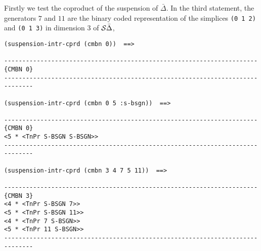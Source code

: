 Firstly we test  the coproduct of the suspension of $\bar\Delta$. In the third
statement, the generators $7$ and $11$ are the binary coded representation
of the simplices {\tt (0 1 2)} and  {\tt (0 1 3)} in dimension $3$ of
${\cal S}\bar\Delta$,
{\footnotesize\begin{verbatim}
(suspension-intr-cprd (cmbn 0))  ==>

----------------------------------------------------------------------{CMBN 0}
------------------------------------------------------------------------------

(suspension-intr-cprd (cmbn 0 5 :s-bsgn))  ==>

----------------------------------------------------------------------{CMBN 0}
<5 * <TnPr S-BSGN S-BSGN>>
------------------------------------------------------------------------------

(suspension-intr-cprd (cmbn 3 4 7 5 11))  ==>

----------------------------------------------------------------------{CMBN 3}
<4 * <TnPr S-BSGN 7>>
<5 * <TnPr S-BSGN 11>>
<4 * <TnPr 7 S-BSGN>>
<5 * <TnPr 11 S-BSGN>>
------------------------------------------------------------------------------
\end{verbatim}}

